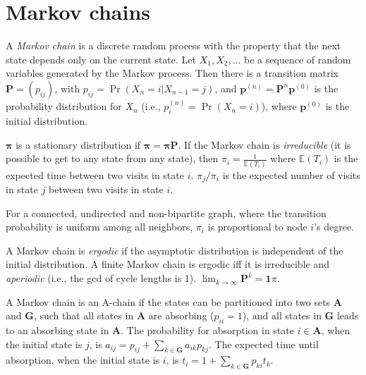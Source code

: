 				\section{Markov chains}
				A \emph{Markov chain} is a discrete random process with the property that the next state depends only on the current state.
				Let $X_1,X_2,\ldots$ be a sequence of random variables generated by the Markov process.
				Then there is a transition matrix $\mathbf{P} = (p_{ij})$, with $p_{ij} = \Pr(X_n = i | X_{n-1} = j)$,
				and $\mathbf{p}^{(n)} = \mathbf P^n \mathbf p^{(0)}$ is the probability distribution for $X_n$ (i.e., $p^{(n)}_i = \Pr(X_n = i)$),
				where $\mathbf{p}^{(0)}$ is the initial distribution.
																												
				$\mathbf{\pi}$ is a stationary distribution if $\mathbf{\pi} = \mathbf{\pi P}$.
				If the Markov chain is \emph{irreducible} (it is possible to get to any state from any state),
				then $\pi_i = \frac{1}{\mathbb{E}(T_i)}$ where $\mathbb{E}(T_i)$  is the expected time between two visits in state $i$.
				$\pi_j/\pi_i$ is the expected number of visits in state $j$ between two visits in state $i$.
																												
				For a connected, undirected and non-bipartite graph, where the transition probability is uniform among all neighbors, $\pi_i$ is proportional to node $i$'s degree.
																												
				A Markov chain is \emph{ergodic} if the asymptotic distribution is independent of the initial distribution.
				A finite Markov chain is ergodic iff it is irreducible and \emph{aperiodic} (i.e., the gcd of cycle lengths is 1).
				$\lim_{k\rightarrow\infty}\mathbf{P}^k = \mathbf{1}\pi$.
																												
				A Markov chain is an A-chain if the states can be partitioned into two sets $\mathbf{A}$ and $\mathbf{G}$, such that all states in $\mathbf{A}$ are absorbing ($p_{ii}=1$), and all states in $\mathbf{G}$ leads to an absorbing state in $\mathbf{A}$.
				The probability for absorption in state $i\in\mathbf{A}$, when the initial state is $j$, is $a_{ij} = p_{ij}+\sum_{k\in\mathbf{G}} a_{ik}p_{kj}$.
				The expected time until absorption, when the initial state is $i$, is $t_i = 1+\sum_{k\in\mathbf{G}}p_{ki}t_k$.

